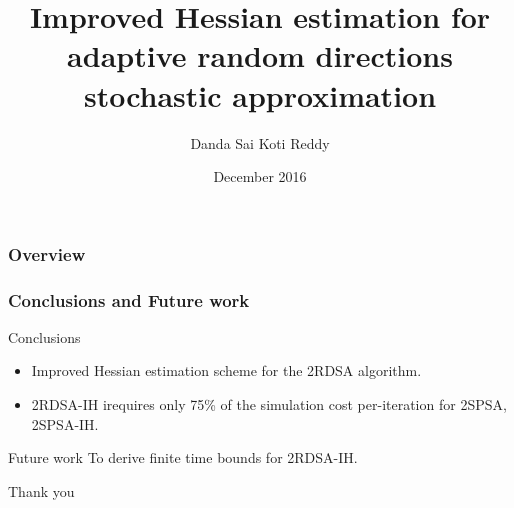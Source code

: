 \documentclass{beamer}
\title[Stochastic optimization]{Improved Hessian estimation for adaptive random directions stochastic approximation} %
\author{ Danda Sai Koti Reddy} %
\institute[IISC] %
{
{Join work with  } \\
\medskip
Prashanth L.A.\\
Shalabh Bhatnagar
%
%
}
\date{December 2016} %
\begin{document}
\begin{frame}
\titlepage 
\end{frame}

\begin{frame}
\frametitle{Overview}
\tableofcontents
\end{frame}



%



\begin{frame}
\frametitle{\centering  Conclusions and Future work}
\begin{block}{Conclusions}
\begin{itemize}
\item Improved Hessian estimation scheme for the 2RDSA algorithm.
\item  2RDSA-IH irequires only 75\% of the simulation cost per-iteration for 2SPSA, 2SPSA-IH.
\end{itemize}
\end{block}
\begin{block}{Future work}
To derive finite time bounds for 2RDSA-IH.
\end{block}

\end{frame}



%
%


\begin{frame}

\begin{block}{}
\begin{center}
{\Huge Thank you}
\end{center}
\end{block}
\end{frame}
\end{document}
